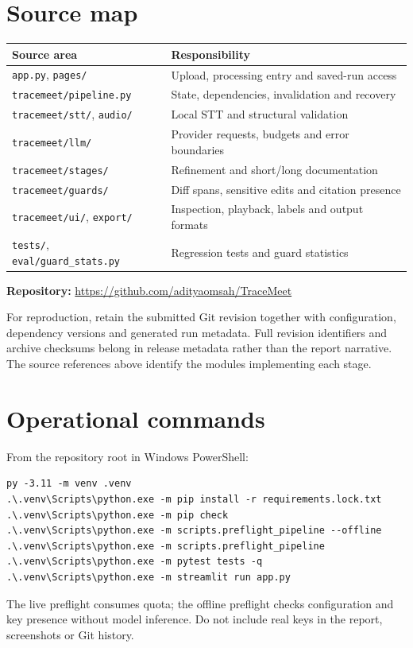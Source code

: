 \documentclass[11pt,a4paper]{article}
\newcommand{\code}[1]{\nolinkurl{#1}}
\begin{document}
\appendix
\section{Source map}
\begin{tabularx}{\textwidth}{@{}lY@{}}\toprule
Source area & Responsibility\\\midrule
\code{app.py}, \code{pages/} & Upload, processing entry and saved-run access\\
\code{tracemeet/pipeline.py} & State, dependencies, invalidation and recovery\\
\code{tracemeet/stt/}, \code{audio/} & Local STT and structural validation\\
\code{tracemeet/llm/} & Provider requests, budgets and error boundaries\\
\code{tracemeet/stages/} & Refinement and short/long documentation\\
\code{tracemeet/guards/} & Diff spans, sensitive edits and citation presence\\
\code{tracemeet/ui/}, \code{export/} & Inspection, playback, labels and output formats\\
\code{tests/}, \code{eval/guard_stats.py} & Regression tests and guard statistics\\\bottomrule
\end{tabularx}

\textbf{Repository:} \url{https://github.com/adityaomsah/TraceMeet}

For reproduction, retain the submitted Git revision together with configuration, dependency versions and generated run metadata. Full revision identifiers and archive checksums belong in release metadata rather than the report narrative. The source references above identify the modules implementing each stage.

\section{Operational commands}
From the repository root in Windows PowerShell:
\begin{lstlisting}
py -3.11 -m venv .venv
.\.venv\Scripts\python.exe -m pip install -r requirements.lock.txt
.\.venv\Scripts\python.exe -m pip check
.\.venv\Scripts\python.exe -m scripts.preflight_pipeline --offline
.\.venv\Scripts\python.exe -m scripts.preflight_pipeline
.\.venv\Scripts\python.exe -m pytest tests -q
.\.venv\Scripts\python.exe -m streamlit run app.py
\end{lstlisting}
The live preflight consumes quota; the offline preflight checks configuration and key presence without model inference. Do not include real keys in the report, screenshots or Git history.
\end{document}
